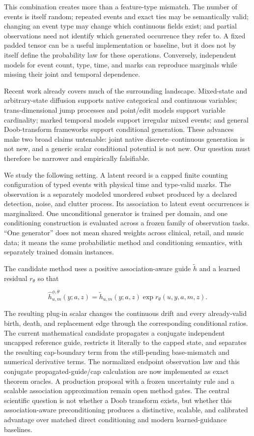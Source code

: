 \documentclass[11pt]{article}
\begin{document}
This combination creates more than a feature-type mismatch. The number of events is itself random; repeated events and exact ties may be semantically valid; changing an event type may change which continuous fields exist; and partial observations need not identify which generated occurrence they refer to. A fixed padded tensor can be a useful implementation or baseline, but it does not by itself define the probability law for these operations. Conversely, independent models for event count, type, time, and marks can reproduce marginals while missing their joint and temporal dependence.

Recent work already covers much of the surrounding landscape. Mixed-state and arbitrary-state diffusion supports native categorical and continuous variables; trans-dimensional jump processes and point/\allowbreak{}edit models support variable cardinality; marked temporal models support irregular mixed events; and general Doob-transform frameworks support conditional generation. These advances make two broad claims untenable: joint native discrete--continuous generation is not new, and a generic scalar conditional potential is not new. Our question must therefore be narrower and empirically falsifiable.

We study the following setting. A latent record is a capped finite counting configuration of typed events with physical time and type-valid marks. The observation is a separately modeled unordered subset produced by a declared detection, noise, and clutter process. Its association to latent event occurrences is marginalized. One unconditional generator is trained per domain, and one conditioning construction is evaluated across a frozen family of observation tasks. ``One generator'' does not mean shared weights across clinical, retail, and music data; it means the same probabilistic method and conditioning semantics, with separately trained domain instances.

The candidate method uses a positive association-aware guide \(\widetilde h\) and a learned residual \(r_\theta\) so that

\[
\widehat h_{u,m}^{\phi,\theta}(y;a,z)
=\widetilde h_{u,m}(y;a,z)
  \exp r_\theta(u,y,a,m,z).
\]

The resulting plug-in scalar changes the continuous drift and every already-valid birth, death, and replacement edge through the corresponding conditional ratios. The current mathematical candidate propagates a conjugate independent uncapped reference guide, restricts it literally to the capped state, and separates the resulting cap-boundary term from the still-pending base-mismatch and numerical derivative terms. The normalized endpoint observation law and this conjugate propagated-guide/\allowbreak{}cap calculation are now implemented as exact theorem oracles. A production proposal with a frozen uncertainty rule and a scalable association approximation remain open method gates. The central scientific question is not whether a Doob transform exists, but whether this association-aware preconditioning produces a distinctive, scalable, and calibrated advantage over matched direct conditioning and modern learned-guidance baselines.
\end{document}
